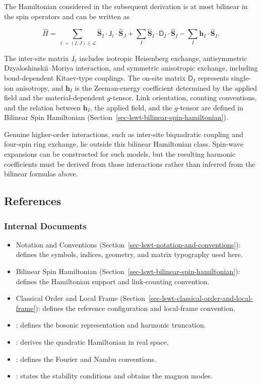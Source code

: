 The Hamiltonian considered in the subsequent derivation is at most bilinear in the spin operators and can be written as

\[
\hat H
=
\sum_{\ell=(I,J)\in\mathcal L}
\hat{\mathbf S}_I
\mathbin{\cdot}
\mathsf J_\ell
\mathbin{\cdot}
\hat{\mathbf S}_J
+
\sum_I
\hat{\mathbf S}_I
\mathbin{\cdot}
\mathsf D_I
\mathbin{\cdot}
\hat{\mathbf S}_I
-
\sum_I
\mathbf h_I
\mathbin{\cdot}
\hat{\mathbf S}_I.
\]

The inter-site matrix \(\mathsf J_\ell\) includes isotropic Heisenberg exchange, antisymmetric Dzyaloshinskii--Moriya interaction, and symmetric anisotropic exchange, including bond-dependent Kitaev-type couplings. The on-site matrix \(\mathsf D_I\) represents single-ion anisotropy, and \(\mathbf h_I\) is the Zeeman-energy coefficient determined by the applied field and the material-dependent \(g\)-tensor. Link orientation, counting conventions, and the relation between \(\mathbf h_I\), the applied field, and the \(g\)-tensor are defined in Bilinear Spin Hamiltonian (Section~\ref{sec-lswt-bilinear-spin-hamiltonian}).

Genuine higher-order interactions, such as inter-site biquadratic coupling and four-spin ring exchange, lie outside this bilinear Hamiltonian class. Spin-wave expansions can be constructed for such models, but the resulting harmonic coefficients must be derived from those interactions rather than inferred from the bilinear formulas above.

\subsection{References}

\subsubsection{Internal Documents}

\begin{itemize}
\tightlist
\item
  Notation and Conventions (Section~\ref{sec-lswt-notation-and-conventions}): defines the symbols, indices, geometry, and matrix typography used here.
\item
  Bilinear Spin Hamiltonian (Section~\ref{sec-lswt-bilinear-spin-hamiltonian}): defines the Hamiltonian support and link-counting convention.
\item
  Classical Order and Local Frame (Section~\ref{sec-lswt-classical-order-and-local-frame}): defines the reference configuration and local-frame convention.
\item
  : defines the bosonic representation and harmonic truncation.
\item
  : derives the quadratic Hamiltonian in real space.
\item
  : defines the Fourier and Nambu conventions.
\item
  : states the stability conditions and obtains the magnon modes.
\end{itemize}

